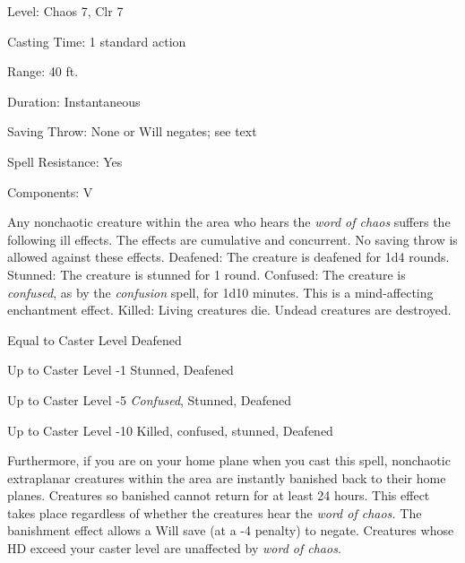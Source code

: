 
\begin{description*}
\item[Level:] Chaos 7, Clr 7
\item[Casting Time:] 1 standard action
\item[Range:] 40 ft.
\item[Duration:] Instantaneous
\item[Saving Throw:] None or Will negates; see text
\item[Spell Resistance:] Yes
\item[Components:] V
\end{description*}

Any nonchaotic creature within the area who hears the \textit{word of chaos} suffers
the following ill effects.
The effects are cumulative and concurrent. No saving throw is allowed against these
effects.
Deafened: The creature is deafened for 1d4 rounds.
Stunned: The creature is stunned for 1 round.
Confused: The creature is \textit{confused}, as by the \textit{confusion
}spell, for 1d10 minutes. This is a mind-affecting enchantment effect.
Killed: Living creatures die. Undead creatures are destroyed.
\begin{description*}
\item[Equal to Caster Level] Deafened
\item[Up to Caster Level -1] Stunned, Deafened
\item[Up to Caster Level -5] \textit{Confused}, Stunned, Deafened
\item[Up to Caster Level -10] Killed, confused, stunned, Deafened
\end{description*}
Furthermore, if you are on your home plane when you cast this spell, nonchaotic
extraplanar creatures within the area are instantly banished back to their home
planes. Creatures so banished cannot return for at least 24 hours. This effect
takes place regardless of whether the creatures hear the \textit{word of chaos.
}The banishment effect allows a Will save (at a -4 penalty) to negate.
Creatures whose HD exceed your caster level are unaffected by \textit{word of chaos}.